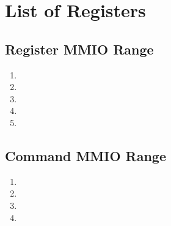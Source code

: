 \section{List of Registers}

\subsection{Register MMIO Range}
\begin{enumerate}
    \item \iommucap
    \item \rsiddiv
    \item \ersiddiv
    \item \dtbase
    \item \ftval
\end{enumerate}

\subsection{Command MMIO Range}

\begin{enumerate}
    \item \iommucapen
    \item \iommuinten
    \item \invltlb
    \item \resume
\end{enumerate}

